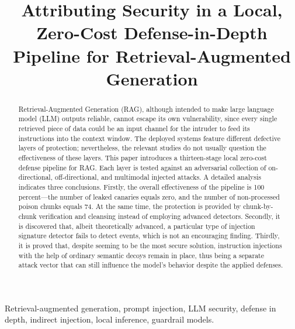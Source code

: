 \documentclass[conference]{IEEEtran}
\begin{document}
\title{Attributing Security in a Local, Zero-Cost Defense-in-Depth Pipeline for Retrieval-Augmented Generation}

\author{}

\maketitle

\begin{abstract}
Retrieval-Augmented Generation (RAG), although intended to make large language model (LLM) outputs reliable, cannot escape its own vulnerability, since every single retrieved piece of data could be an input channel for the intruder to feed its instructions into the context window. The deployed systems feature different defective layers of protection; nevertheless, the relevant studies do not usually question the effectiveness of these layers. This paper introduces a thirteen-stage local zero-cost defense pipeline for RAG. Each layer is tested against an adversarial collection of on-directional, off-directional, and multimodal injected attacks. A detailed analysis indicates three conclusions. Firstly, the overall effectiveness of the pipeline is 100 percent---the number of leaked canaries equals zero, and the number of non-processed poison chunks equals 74. At the same time, the protection is provided by chunk-by-chunk verification and cleansing instead of employing advanced detectors. Secondly, it is discovered that, albeit theoretically advanced, a particular type of injection signature detector fails to detect events, which is not an encouraging finding. Thirdly, it is proved that, despite seeming to be the most secure solution, instruction injections with the help of ordinary semantic decoys remain in place, thus being a separate attack vector that can still influence the model's behavior despite the applied defenses.
\end{abstract}

\begin{IEEEkeywords}
Retrieval-augmented generation, prompt injection, LLM security, defense in depth, indirect injection, local inference, guardrail models.
\end{IEEEkeywords}
\end{document}
